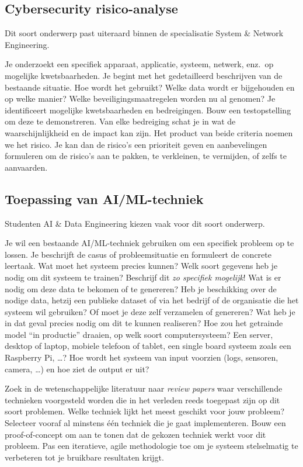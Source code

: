 \subsection{Cybersecurity risico-analyse}%
\label{ssec:onderwerp_types_cybersecurity_risico_analyse}

Dit soort onderwerp past uiteraard binnen de specialisatie System \& Network Engineering.

Je onderzoekt een specifiek apparaat, applicatie, systeem, netwerk, enz.\ op mogelijke kwetsbaarheden. Je begint met het gedetailleerd beschrijven van de bestaande situatie. Hoe wordt het gebruikt? Welke data wordt er bijgehouden en op welke manier? Welke beveiligingsmaatregelen worden nu al genomen? Je identificeert mogelijke kwetsbaarheden en bedreigingen. Bouw een testopstelling om deze te demonstreren. Van elke bedreiging schat je in wat de waarschijnlijkheid en de impact kan zijn. Het product van beide criteria noemen we het risico. Je kan dan de risico's een prioriteit geven en aanbevelingen formuleren om de risico's aan te pakken, te verkleinen, te vermijden, of zelfs te aanvaarden.

\subsection{Toepassing van AI/ML-techniek}%
\label{ssec:onderwerp_types_ai_toepassing}

Studenten AI \& Data Engineering kiezen vaak voor dit soort onderwerp.

Je wil een bestaande AI/ML-techniek gebruiken om een specifiek probleem op te lossen. Je beschrijft de casus of probleemsituatie en formuleert de concrete leertaak. Wat moet het systeem precies kunnen? Welk soort gegevens heb je nodig om dit systeem te trainen? Beschrijf dit \emph{zo specifiek mogelijk}! Wat is er nodig om deze data te bekomen of te genereren? Heb je beschikking over de nodige data, hetzij een publieke dataset of via het bedrijf of de organisatie die het systeem wil gebruiken? Of moet je deze zelf verzamelen of genereren? Wat heb je in dat geval precies nodig om dit te kunnen realiseren? Hoe zou het getrainde model ``in productie'' draaien, op welk soort computersysteem? Een server, desktop of laptop, mobiele telefoon of tablet, een single board systeem zoals een Raspberry Pi, \ldots? Hoe wordt het systeem van input voorzien (logs, sensoren, camera, \ldots) en hoe ziet de output er uit?

Zoek in de wetenschappelijke literatuur naar \emph{review papers} waar verschillende technieken voorgesteld worden die in het verleden reeds toegepast zijn op dit soort problemen. Welke techniek lijkt het meest geschikt voor jouw probleem? Selecteer vooraf al minstens één techniek die je gaat implementeren. Bouw een proof-of-concept om aan te tonen dat de gekozen techniek werkt voor dit probleem. Pas een iteratieve, agile methodologie toe om je systeem stelselmatig te verbeteren tot je bruikbare resultaten krijgt.

